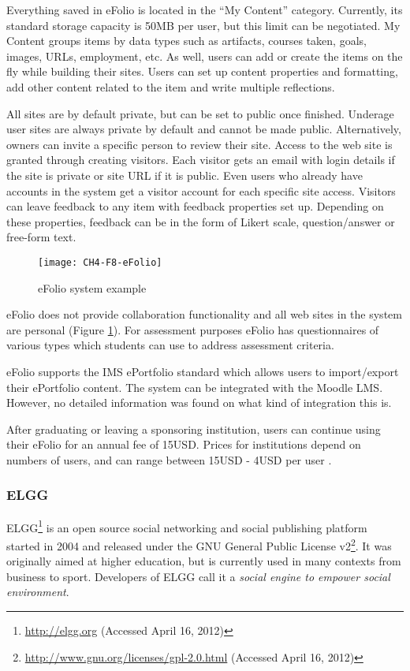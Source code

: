 Everything saved in eFolio is located in the ``My Content'' category. Currently,
its standard storage capacity is 50MB per user, but this limit can be
negotiated. My Content groups items by data types such as artifacts, courses
taken, goals, images, URLs, employment, etc. As well, users can add or create
the items on the fly while building their sites. Users can set up content
properties and formatting, add other content related to the item and write
multiple reflections.

All sites are by default private, but can be set to public once finished.
Underage user sites are always private by default and cannot be made public.
Alternatively, owners can invite a specific person to review their site. Access
to the web site is granted through creating visitors. Each visitor gets an email
with login details if the site is private or site URL if it is public. Even
users who already have accounts in the system get a visitor account for each
specific site access. Visitors can leave feedback to any item with feedback
properties set up. Depending on these properties, feedback can be in the form of
Likert scale, question/answer or free-form text.

\begin{figure}[htb]
\centering
\setlength\fboxsep{0pt}
\setlength\fboxrule{0.5pt}
\texttt{[image: CH4-F8-eFolio]}
\caption[eFolio system example]{eFolio system example \citep{EFolioMinnesota2011}}
\label{fig:efolio}
\end{figure}

eFolio does not provide collaboration functionality and all web sites in the
system are personal (Figure \ref{fig:efolio}). For assessment purposes eFolio
has questionnaires of various types which students can use to address assessment
criteria.

eFolio supports the IMS ePortfolio standard \citep{AAEEBL2011} which allows
users to import/export their ePortfolio content. The system can be integrated
with the Moodle LMS. However, no detailed information was found on what kind of
integration this is.

After graduating or leaving a sponsoring institution, users can continue
using their eFolio for an annual fee of 15USD. Prices for institutions depend
on numbers of users, and can range between 15USD - 4USD per user
\citep{AAEEBL2011}.

\subsubsection{ELGG}
ELGG\footnote{\url{http://elgg.org} (Accessed April 16, 2012)} is an open source
social networking and social publishing platform started in 2004 and released under the GNU
General Public License
v2\footnote{\url{http://www.gnu.org/licenses/gpl-2.0.html} (Accessed April 16,
2012)}. It was originally aimed at higher education, but is currently used in many contexts from business
to sport. Developers of ELGG call it a \textit{social engine to empower social
environment}.


